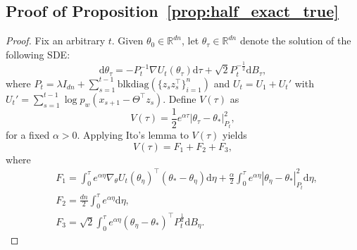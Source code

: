 \documentclass[11pt]{article}
\theoremstyle{plain}
\theoremstyle{definition}
\theoremstyle{remark}
\begin{document}
\subsection{Proof of Proposition~\ref{prop:half_exact_true}}
\label{app:prop:half_exact_true}
\begin{proof}
Fix an arbitrary $t$. Given $\theta_0 \in \mathbb{R}^{dn}$, let $\theta_\tau \in \mathbb{R}^{dn}$ denote the solution of the following SDE:
\[
\mathrm{d}\theta_\tau = -P_t^{-1}\nabla U_t(\theta_\tau)\mathrm{d}\tau + \sqrt{2}P_t^{-\frac{1}{2}}\mathrm{d}B_\tau,
\]
where $P_t= \lambda {I_{dn}} + \sum_{s=1}^{t-1} \mathrm{blkdiag}(\{z_sz_s^{\top}\}_{i=1}^n)$ and $U_t = U_1 +U_t'$ with $U_t' =\sum_{s=1}^{t-1}\log p_w(x_{s+1}-\Theta^{\top}z_s)$.
Define $V(\tau)$ as
\[
V(\tau) = \frac{1}{2}e^{\alpha \tau}|\theta_\tau-\theta_*|_{P_t}^2,
\]
for a fixed $\alpha>0$. 
Applying Ito's lemma to $V(\tau)$ yields
\[
V(\tau) = F_1 + F_2 + F_3,
\]
where 
\begin{equation}\nonumber
\begin{split}
    &F_1 = \int_0^\tau e^{\alpha \eta}\nabla_{\theta}U_t(\theta_\eta)^{\top}(\theta_*-\theta_\eta) \mathrm{d} \eta + \frac{\alpha}{2}\int_0^\tau e^{\alpha \eta}|\theta_\eta-\theta_*|_{P_t}^2 \mathrm{d} \eta,\\
    &F_2 = \frac{dn}{2} \int_0^\tau e^{\alpha \eta}\mathrm{d} \eta,\\
    &F_3 = \sqrt{2}\int_0^\tau e^{\alpha \eta} (\theta_\eta - \theta_*)^{\top}P_t^{\frac{1}{2}}\mathrm{d}B_\eta.
\end{split}
\end{equation}


\end{proof}
\end{document}
